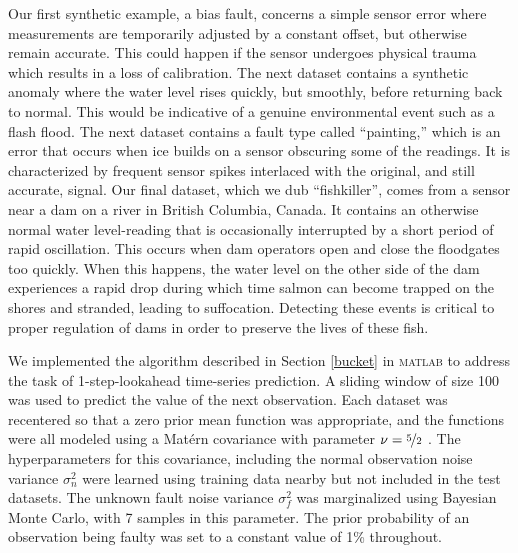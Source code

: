 \documentclass{article}
\begin{document}
Our first synthetic example, a bias fault, concerns a simple sensor
error where measurements are temporarily adjusted by a constant
offset, but otherwise remain accurate. This could happen if the sensor
undergoes physical trauma which results in a loss of calibration.
The next dataset contains a synthetic anomaly where the water level
rises quickly, but smoothly, before returning back to normal. This
would be indicative of a genuine environmental event such as a flash
flood.
The next dataset contains a fault type called ``painting,'' which is
an error that occurs when ice builds on a sensor obscuring some of the
readings. It is characterized by frequent sensor spikes interlaced
with the original, and still accurate, signal.
Our final dataset, which we dub ``fishkiller'', comes from a sensor
near a dam on a river in British Columbia, Canada. It contains an
otherwise normal water level-reading that is occasionally interrupted
by a short period of rapid oscillation. This occurs when dam operators
open and close the floodgates too quickly. When this happens, the
water level on the other side of the dam experiences a rapid drop
during which time salmon can become trapped on the shores and
stranded, leading to suffocation. Detecting these events is critical
to proper regulation of dams in order to preserve the lives of these fish.


We implemented the algorithm described in Section \ref{bucket} in
\textsc{matlab} to address the task of 1-step-lookahead time-series
prediction.  A sliding window of size 100 was used to predict the
value of the next observation.  Each dataset was recentered so that a
zero prior mean function was appropriate, and the functions were all
modeled using a Mat\'{e}rn covariance with parameter $\nu =
\nicefrac{5}{2}$ \citep{gpml}.  The hyperparameters for this
covariance, including the normal observation noise variance
$\sigma_n^2$ were learned using training data nearby but not included
in the test datasets.  The unknown fault noise variance $\sigma_f^2$
was marginalized using Bayesian Monte Carlo, with 7 samples in this
parameter.  The prior probability of an observation being faulty was
set to a constant value of 1\% throughout.
\end{document}
